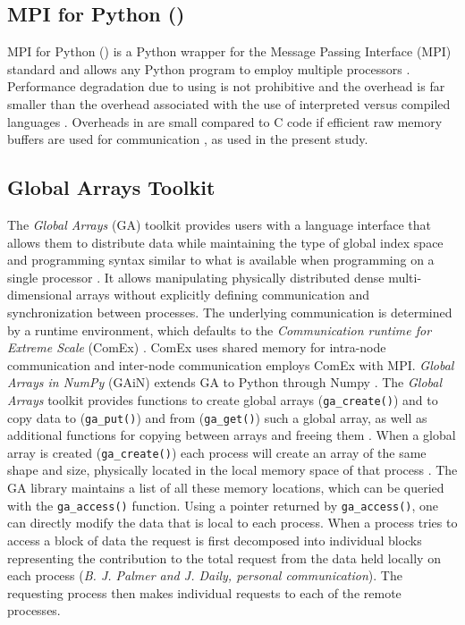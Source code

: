 \subsection{MPI for Python ()}
\label{sec:methods-mpi4py}

MPI for Python () is a Python wrapper for the Message Passing Interface (MPI) standard and allows any Python program to employ multiple processors \cite{Dalcin:2011aa, Dalcin:2005aa}.
Performance degradation due to using  is not prohibitive \cite{Dalcin:2011aa, Dalcin:2005aa} and the overhead is far smaller than the overhead associated with the use of interpreted versus compiled languages \cite{GAiN}.
Overheads in  are small compared to C code if efficient raw memory buffers are used for communication \cite{Dalcin:2011aa}, as used in the present study.

\subsection{Global Arrays Toolkit}
\label{sec:methods-ga}

The \emph{Global Arrays} (GA) toolkit provides users with a language interface that allows them to distribute data while maintaining the type of global index space and programming syntax similar to what is available when programming on a single processor \cite{GA}.
It allows manipulating physically distributed dense multi-dimensional arrays without explicitly defining communication and synchronization between processes.
The underlying communication is determined by a runtime environment, which defaults to the \emph{Communication runtime for Extreme Scale} (ComEx) \cite{Daily:2014aa}.
ComEx uses shared memory for intra-node communication and inter-node communication employs ComEx with MPI.
\emph{Global Arrays in NumPy} (GAiN) extends GA to Python through Numpy \cite{GAiN}. 
The \emph{Global Arrays} toolkit provides functions to create global arrays (\texttt{ga\_create()}) and to copy data to (\texttt{ga\_put()}) and from (\texttt{ga\_get()}) such a global array,  as well as additional functions for copying between arrays and freeing them \cite{GAiN}.
When a global array is created (\texttt{ga\_create()}) each process will create an array of the same shape and size, physically located in the local memory space of that process \cite{GA}. 
The GA library maintains a list of all these memory locations, which can be queried with the \texttt{ga\_access()} function.
Using a pointer returned by \texttt{ga\_access()}, one can directly modify the data that is local to each process.
When a process tries to access a block of data the request is first decomposed into individual blocks representing the contribution to the total request from the data held locally on each process (\textit{B. J. Palmer and J. Daily, personal communication}).
The requesting process then makes individual requests to each of the remote processes. 

